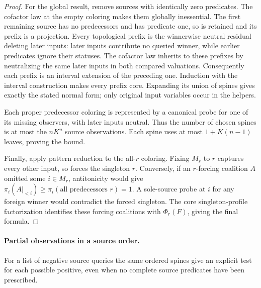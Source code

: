 \begin{proof}
For the global result, remove sources with identically zero predicates.
The cofactor law at the empty coloring makes them globally inessential.
The first remaining source has no predecessors and has predicate one,
so is retained and its prefix is a projection.
Every topological prefix is the winnerwise neutral residual deleting
later inputs: later inputs contribute no queried winner, while earlier
predicates ignore their statuses. The cofactor law inherits to these
prefixes by neutralizing the same later inputs in both compared valuations.
Consequently each prefix is an interval extension of the preceding one.
Induction with the interval construction makes every prefix core.
Expanding its union of spines gives exactly the stated normal form;
only original input variables occur in the helpers.

Each proper predecessor coloring is represented by a canonical probe
for one of its missing observers, with later inputs neutral. Thus the
number of chosen spines is at most the $nK^n$ source observations.
Each spine uses at most $1+K(n-1)$ leaves, proving the bound.

Finally, apply pattern reduction to the all-$r$ coloring.
Fixing $M_r$ to $r$ captures every other input, so forces the singleton
$r$. Conversely, if an $r$-forcing coalition $A$ omitted some $i\in M_r$,
antitonicity would give
$\pi_i(A|_{<i})\geq\pi_i(\text{all predecessors }r)=1$.
A sole-source probe at $i$ for any foreign winner would contradict the
forced singleton. The core singleton-profile factorization identifies
these forcing coalitions with $\Phi_r(F)$, giving the final formula.
\end{proof}

\paragraph{Partial observations in a source order.}
For a list of negative source queries the same ordered spines give
an explicit test for each possible positive, even when no complete
source predicates have been prescribed.


